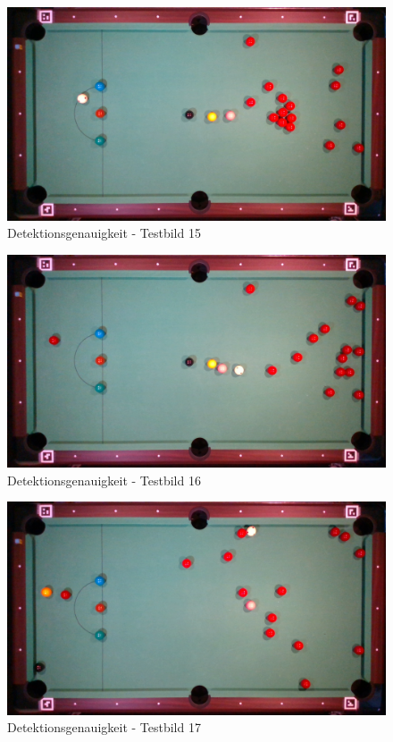 \begin{figure}[h!]
    \begin{center}
        \includegraphics[width=0.8\linewidth]{../common/07_appendix/resources/00_detection/14_detektion_testbild_15.png}
    \end{center}
    \caption{Detektionsgenauigkeit - Testbild 15}
    \label{fig:detektionsgenauigkeit:testbild:15}
\end{figure}
\begin{figure}[h!]
    \begin{center}
        \includegraphics[width=0.8\linewidth]{../common/07_appendix/resources/00_detection/15_detektion_testbild_16.png}
    \end{center}
    \caption{Detektionsgenauigkeit - Testbild 16}
    \label{fig:detektionsgenauigkeit:testbild:16}
\end{figure}
\begin{figure}[h!]
    \begin{center}
        \includegraphics[width=0.8\linewidth]{../common/07_appendix/resources/00_detection/16_detektion_testbild_17.png}
    \end{center}
    \caption{Detektionsgenauigkeit - Testbild 17}
    \label{fig:detektionsgenauigkeit:testbild:17}
\end{figure}
